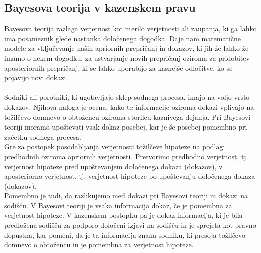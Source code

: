 \documentclass[fin1, tisk]{fmfdelo}
\theoremstyle{definition}
\theoremstyle{trditev}
\theoremstyle{izrek}
\begin{document}
\subsection{Bayesova teorija v kazenskem pravu}
Bayesova teorija razlaga verjetnost kot merilo verjetnosti ali zaupanja, ki ga lahko ima posameznik glede nastanka določenega dogodka. Daje nam
matematične modele za vključevanje naših apriornih prepričanj in dokazov, ki jih že lahko že imamo o nekem dogodku, za ustvarjanje novih prepričanj 
oziroma za pridobitev aposteriornih prepričanj, ki se lahko uporabijo za kasnejše odločitve, ko se pojavijo novi dokazi.\\\\
Sodniki ali porotniki, ki ugotavljajo sklep sodnega procesa, imajo na voljo vrsto dokazov. Njihova naloga je ocena, kako te informacije oziroma dokazi vplivajo 
na tožilčevo domnevo o obtožencu oziroma storilcu kaznivega dejanja. Pri Bayesovi teoriji moramo upoštevati vsak dokaz posebej, kar je še posebej 
pomembno pri začetku sodnega procesa. \\
Gre za postopek posodabljanja verjetnosti tožilčeve hipoteze na podlagi predhodnih oziroma apriornih verjetnosti. Pretvorimo predhodno verjetnost, 
tj. verjetnost hipoteze pred upoštevanjem določenega dokaza (dokazov), v aposteriorno verjetnost, tj. verjetnost hipoteze po upoštevanju določenega 
dokaza (dokazov).\\
Pomembno je tudi, da razlikujemo med dokazi pri Bayesovi teoriji in dokazi na sodišču. V Bayesovi teoriji je vsaka informacija dokaz, če je pomembna 
za verjetnost hipoteze. V kazenskem postopku pa je dokaz informacija, ki je bila predložena sodišču za podporo določeni izjavi na sodišču in je 
sprejeta kot pravno dopustna, kar pomeni, da je ta informacija znana sodniku, ki presoja tožilčevo domnevo o obtožencu in je pomembna za 
verjetnost hipoteze.

\end{document}
